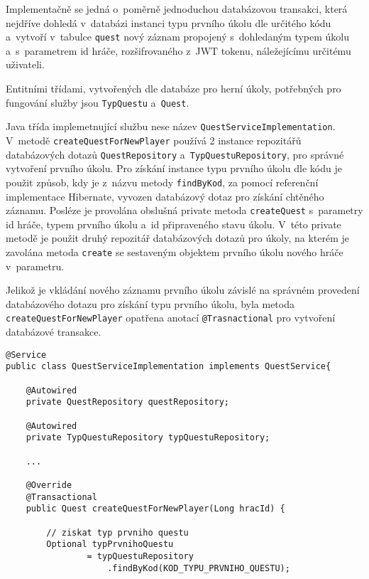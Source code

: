 \documentclass[12pt]{article}
\begin{document}
{Implementačně se jedná o~poměrně jednoduchou databázovou transakci, která nejdříve dohledá v~databázi instanci typu prvního úkolu dle určitého kódu a~vytvoří v~tabulce \texttt{quest} nový záznam propojený s~dohledaným typem úkolu a~s~parametrem id hráče, rozšifrovaného z~JWT tokenu, náležejícímu určitému uživateli.


Entitními třídami, vytvořených dle databáze pro herní úkoly, 
potřebných pro fungování služby jsou \texttt{TypQuestu} a~\texttt{Quest}.


\obrazek
{}


Java třída implemetnující službu nese název \texttt{QuestServiceImplementation}.
V~metodě \texttt{createQuestForNewPlayer} používá 2 instance repozitářů databázových dotazů \texttt{QuestRepository} a~\texttt{TypQuestuRepository}, pro správné vytvoření prvního úkolu. Pro získání instance typu prvního úkolu dle kódu je použit způsob, kdy je z~názvu metody \texttt{findByKod}, za pomocí referenční implementace Hibernate, vyvozen databázový dotaz pro získání chtěného záznamu. Posléze je provolána obslušná private metoda \texttt{createQuest} s~parametry id hráče, typem prvního úkolu a~id připraveného stavu úkolu. V~této private metodě je použit druhý repozitář databázových dotazů pro úkoly, na kterém je zavolána metoda \texttt{create} se sestaveným objektem prvního úkolu nového hráče v~parametru.

Jelikož je vkládání nového záznamu prvního úkolu závislé na správném provedení databázového dotazu pro získání typu prvního úkolu, byla metoda\texttt{ createQuestForNewPlayer} opatřena anotací \texttt{@Trasnactional} pro vytvoření databázové transakce.

\begin{lstlisting}
@Service
public class QuestServiceImplementation implements QuestService{
    
    @Autowired
    private QuestRepository questRepository;
    
    @Autowired
    private TypQuestuRepository typQuestuRepository;
    
    ...
    
    @Override
    @Transactional
    public Quest createQuestForNewPlayer(Long hracId) {

        // ziskat typ prvniho questu
        Optional typPrvnihoQuestu
                = typQuestuRepository
                    .findByKod(KOD_TYPU_PRVNIHO_QUESTU);


\end{lstlisting}}
\end{document}
